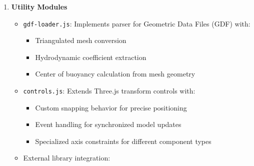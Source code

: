 \documentclass[
  letterpaper,
  DIV=11,
  numbers=noendperiod]{scrreprt}
\providecommand{\tightlist}{%
  \setlength{\itemsep}{0pt}\setlength{\parskip}{0pt}}\usepackage{longtable,booktabs,array}
\begin{document}
\begin{enumerate}
\begin{itemize}
    \begin{itemize}
    \tightlist
    \item
      \texttt{geometry.yml} with vessel dimensions and center points
    \item
      \texttt{hydrodynamics.yml} with coefficient grouping by motion
      direction (X/Y/Z/K/M/N)
    \item
      \texttt{inertia.yml} with mass matrix and added mass coefficients
    \item
      \texttt{control\_surfaces.yml} with NACA profile properties and
      dynamics
    \item
      \texttt{thrusters.yml} with propulsion characteristics and
      placement
    \item
      \texttt{initial\_conditions.yml} with startup position and
      velocity
    \item
      \texttt{sensors.yml} with instrumentation configuration and noise
      models
    \end{itemize}
  \item
    Generates Docker-compatible file paths for simulator integration
    (\texttt{/workspaces/mavlab/inputs/...})
  \item
    Performs semantic validation with appropriate warning generation
  \item
    Uses JSZip library for creating multi-file archives with proper
    directory structure
  \end{itemize}
\item
  \textbf{Utility Modules}

  \begin{itemize}
  \tightlist
  \item
    \texttt{gdf-loader.js}: Implements parser for Geometric Data Files
    (GDF) with:

    \begin{itemize}
    \tightlist
    \item
      Triangulated mesh conversion
    \item
      Hydrodynamic coefficient extraction
    \item
      Center of buoyancy calculation from mesh geometry
    \end{itemize}
  \item
    \texttt{controls.js}: Extends Three.js transform controls with:

    \begin{itemize}
    \tightlist
    \item
      Custom snapping behavior for precise positioning
    \item
      Event handling for synchronized model updates
    \item
      Specialized axis constraints for different component types
    \end{itemize}
  \item
    External library integration:


\end{itemize}
\end{enumerate}
\end{document}
